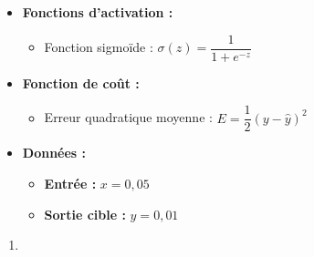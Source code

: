 {{\begin{itemize}
		\item \textbf{Fonctions d'activation :}
		\begin{itemize}
			\item Fonction sigmoïde : \( \sigma(z) = \dfrac{1}{1 + e^{-z}} \)
		\end{itemize}
		
		\item \textbf{Fonction de coût :}
		\begin{itemize}
			\item Erreur quadratique moyenne : \( E = \dfrac{1}{2}(y - \hat{y})^2 \)
		\end{itemize}
		
		\item \textbf{Données :}
		\begin{itemize}
			\item \textbf{Entrée :} \( x = 0{,}05 \)
			\item \textbf{Sortie cible :} \( y = 0{,}01 \)
		\end{itemize}
	\end{itemize}
 }

 \begin{enumerate}
	\item {}
	\indication{}
\end{enumerate}}
